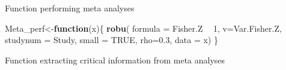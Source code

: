 \documentclass[
]{book}
\newenvironment{Shaded}{\begin{snugshade}}{\end{snugshade}}
\newcommand{\ControlFlowTok}[1]{\textcolor[rgb]{0.13,0.29,0.53}{\textbf{#1}}}
\newcommand{\DataTypeTok}[1]{\textcolor[rgb]{0.13,0.29,0.53}{#1}}
\newcommand{\DecValTok}[1]{\textcolor[rgb]{0.00,0.00,0.81}{#1}}
\newcommand{\FloatTok}[1]{\textcolor[rgb]{0.00,0.00,0.81}{#1}}
\newcommand{\KeywordTok}[1]{\textcolor[rgb]{0.13,0.29,0.53}{\textbf{#1}}}
\newcommand{\NormalTok}[1]{#1}
\newcommand{\OperatorTok}[1]{\textcolor[rgb]{0.81,0.36,0.00}{\textbf{#1}}}
\newcommand{\OtherTok}[1]{\textcolor[rgb]{0.56,0.35,0.01}{#1}}
\newcommand{\StringTok}[1]{\textcolor[rgb]{0.31,0.60,0.02}{#1}}
\begin{document}
Function performing meta analyses

\begin{Shaded}
\begin{Highlighting}[]
\NormalTok{Meta_perf<-}\ControlFlowTok{function}\NormalTok{(x)\{}
  \KeywordTok{robu}\NormalTok{(}
  \DataTypeTok{formula =}\NormalTok{ Fisher.Z }\OperatorTok{~}\StringTok{ }\DecValTok{1}\NormalTok{, }
  \DataTypeTok{v=}\NormalTok{Var.Fisher.Z,}
  \DataTypeTok{studynum =}\NormalTok{ Study, }
  \DataTypeTok{small =} \OtherTok{TRUE}\NormalTok{,}
  \DataTypeTok{rho=}\FloatTok{0.3}\NormalTok{,}
  \DataTypeTok{data =}\NormalTok{ x) \}}
\end{Highlighting}
\end{Shaded}

Function extracting critical information from meta analyses
\end{document}
